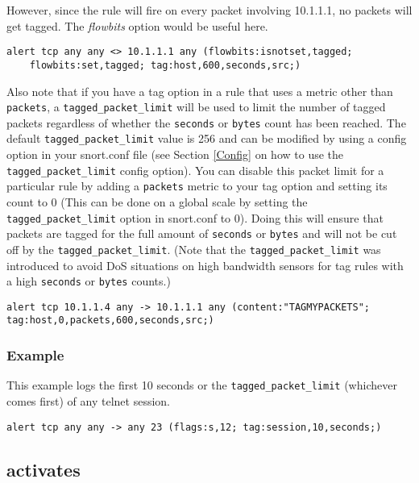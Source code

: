 \documentclass[english]{report}
\begin{document}
However, since the rule will fire on every packet involving 10.1.1.1, no packets will get tagged.  The \emph{flowbits} option would be useful here.

\begin{verbatim}
alert tcp any any <> 10.1.1.1 any (flowbits:isnotset,tagged; 
    flowbits:set,tagged; tag:host,600,seconds,src;)
\end{verbatim}

Also note that if you have a tag option in a rule that uses a metric other than \texttt{packets},
a \texttt{tagged\_packet\_limit} will be used to limit the number of tagged packets regardless
of whether the \texttt{seconds} or \texttt{bytes} count has been reached.
The default \texttt{tagged\_packet\_limit} value is 256 and can be modified by using a config option
in your snort.conf file (see Section \ref{Config} on how to use the \texttt{tagged\_packet\_limit} config option).
You can disable this packet limit for a particular rule by adding a \texttt{packets} metric to 
your tag option and setting its count to 0 (This can be done on a global scale by setting the
\texttt{tagged\_packet\_limit} option in snort.conf to 0).  Doing this will ensure that packets are tagged for the
full amount of \texttt{seconds} or \texttt{bytes} and will not be cut off by the \texttt{tagged\_packet\_limit}. 
(Note that the \texttt{tagged\_packet\_limit} was introduced to avoid DoS situations on high bandwidth sensors for
tag rules with a high \texttt{seconds} or \texttt{bytes} counts.)

\begin{verbatim}
alert tcp 10.1.1.4 any -> 10.1.1.1 any (content:"TAGMYPACKETS"; tag:host,0,packets,600,seconds,src;)
\end{verbatim}


\subsubsection{Example}

This example logs the first 10 seconds or the \texttt{tagged\_packet\_limit} (whichever comes first) of any telnet session.
\begin{verbatim}
alert tcp any any -> any 23 (flags:s,12; tag:session,10,seconds;)
\end{verbatim}


\subsection{activates}
\end{document}
